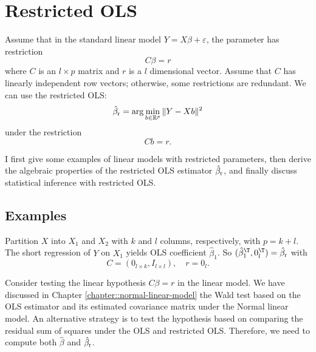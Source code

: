  
\chapter{Restricted OLS}
 \label{chapter::rols}
  



Assume that in the standard linear model $Y=X\beta  + \varepsilon$, the parameter has restriction
\begin{equation}
\label{eq::rOLS-restriction}
C \beta = r
\end{equation}
where $C $ is an $l\times p$ matrix and $r$ is a $l$ dimensional vector. Assume that $C $ has linearly independent row vectors; otherwise, some restrictions are redundant. 
We can use the  restricted OLS:  
$$
\hat\beta_\textup{r} = 
\arg \min_{b\in \mathbb{R}^p }  \|  Y - Xb \|^2
$$
under the restriction 
$$
C  b = r . 
$$

I first give some examples of linear models with restricted parameters, then derive the algebraic properties of the restricted OLS estimator $\hat\beta_\textup{r} $, and finally discuss statistical inference with restricted OLS. 




\section{Examples}


\begin{example}\label{eg::short-regression-rols}
Partition $X$ into $X_1$ and $X_2$ with $k$ and $l$ columns, respectively, with $p = k+l$. The short regression of $Y$ on $X_1$ yields OLS coefficient $\hat\beta_1$. So $(\hat\beta_1^{\T}, 0_l^{\T}) = \hat\beta_\textup{r} $ with 
$$
C  = (0_{l\times k}, I_{l\times l}),\quad r=0_l. 
$$
\end{example}




\begin{example}\label{eg::test-linear-hypothesis-rols}
Consider testing the linear hypothesis $C \beta = r$ in the linear model. We have discussed in Chapter \ref{chapter::normal-linear-model} the Wald test based on the OLS estimator and its estimated covariance matrix under the Normal linear model. An alternative strategy is to test the hypothesis based on comparing the residual sum of squares under the OLS and restricted OLS. Therefore, we need to compute both $\hat\beta$ and $\hat\beta_\textup{r} $. 
\end{example}





